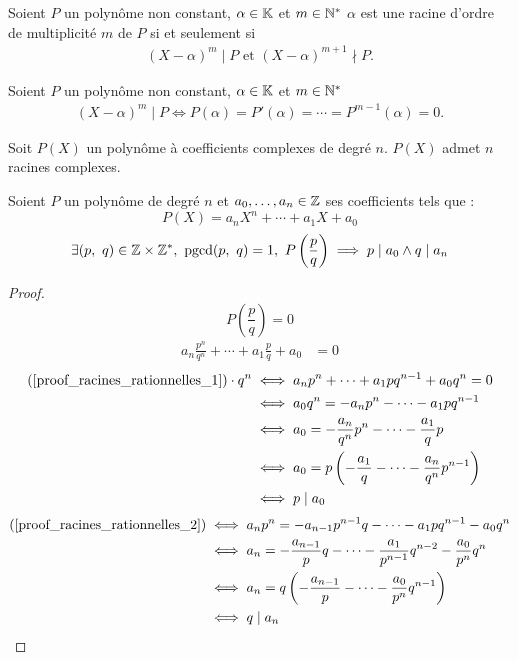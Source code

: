 \begin{definition}\label{def:ordre_mult}
	Soient $P$ un polynôme non constant, $\alpha \in \mathbb{K}$ et $m \in \mathbb{N}^*$ $\alpha$ est une racine d'ordre de multiplicité $m$ de $P$ si et seulement si
	\begin{align*}
		(X - \alpha)^m \mid P \text{ et } (X - \alpha)^{m+1} \nmid P.
	\end{align*}
\end{definition}

\begin{theorem}
	Soient $P$ un polynôme non constant, $\alpha \in \mathbb{K}$ et $m \in \mathbb{N}^*$
	\begin{align*}
		(X - \alpha)^m \mid P \iff P(\alpha) = P'(\alpha) = \cdots = P^{m-1}(\alpha) = 0.
	\end{align*}
\end{theorem}

\begin{theorem}
	Soit $P(X)$ un polynôme à coefficients complexes de degré $n$. $P(X)$ admet $n$ racines complexes. 
\end{theorem}

\begin{theorem}
	Soient $P$ un polynôme de degré $n$ et $a_0, \ldots, a_n \in \mathbb{Z}$ ses coefficients tels que :
	\[ P(X) = a_n X^n + \cdots + a_1 X + a_0 \]
	\[ \exists (p,\ q) \in \Z \times \Z^*,\ \pgcd(p,\ q) = 1,\ P\left( \frac{p}{q} \right) \implies p \mid a_0 \land q \mid a_n \]
\end{theorem}

\begin{proof}
	\[ P \left(\frac{p}{q}\right) = 0 \]
	\begin{align}\label{proof_racines_rationnelles_1}
		a_n \frac{p^n}{q^n} + \cdots + a_1 \frac{p}{q} + a_0 &= 0 
	\end{align}
	\begin{align}\label{proof_racines_rationnelles_2}
		(\ref{proof_racines_rationnelles_1}) \cdot q^n &\iff a_n p^n + \cdots + a_1 p q^{n-1} + a_0 q^n = 0 \\
	&\iff a_0 q^n = -a_n p^n - \cdots - a_1 p q^{n-1} \nonumber \\
	&\iff a_0 = -\frac{a_n}{q^n} p^n - \cdots - \frac{a_1}{q} p \nonumber \\
	&\iff a_0 = p \left( - \frac{a_1}{q} - \cdots - \frac{a_n}{q^n} p^{n-1} \right) \nonumber \\
	&\iff p \mid a_0 \nonumber
	\end{align}
	\begin{align*}
		(\ref{proof_racines_rationnelles_2}) &\iff a_n p^n = - a_{n-1} p^{n-1} q - \cdots - a_1 p q^{n-1} - a_0 q^n \\
		&\iff a_n = - \frac{a_{n-1}}{p} q - \cdots - \frac{a_1}{p^{n-1}} q^{n-2} - \frac{a_0}{p^n} q^n \\
		&\iff a_n = q \left( -\frac{a_{n-1}}{p} - \cdots - \frac{a_0}{p^n} q^{n-1} \right) \\
		&\iff q \mid a_n
	\end{align*}
\end{proof}

